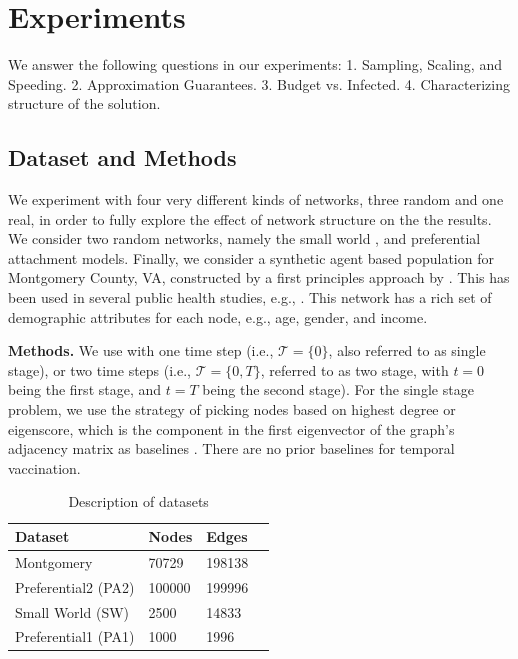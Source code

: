 \section{Experiments}
\label{sec:experiments}
We answer the following questions in our experiments:
1. Sampling, Scaling, and Speeding.
2. Approximation Guarantees.
3. Budget vs. Infected.
4. Characterizing structure of the solution.

\subsection{Dataset and Methods}
We experiment with four very different kinds of networks, three random and one real, in order to fully explore the effect of network structure on the the results. We consider two random networks, namely the small world 
\cite{Kleinberg00thesmall-world}, and preferential attachment \cite{Barabasi509} models. Finally, we consider a synthetic agent based population for Montgomery County, VA, constructed by a first principles approach by \cite{barrett:wsc09,eubank:nature04}. This has been used in several public health studies, e.g., \cite{singh:bmc19}. This network has a rich set of demographic attributes for each node, e.g., age, gender, and income.

\noindent
\textbf{Methods.}
We use \algo{} with one time step (i.e., $\mathcal{T}=\{0\}$, also referred to as single stage), or two time steps (i.e., $\mathcal{T}=\{0, T\}$, referred to as two stage, with $t=0$ being the first stage, and $t=T$ being the second stage). For the single stage problem, we use the strategy of picking nodes based on highest degree or eigenscore, which is the component in the first eigenvector of the graph's adjacency matrix as baselines \cite{tong:cikm12}.
There are no prior baselines for temporal vaccination. 

\begin{table}[!h]
\centering
\begin{tabular}{llll}
\hline
 \textbf{Dataset} & \textbf{Nodes} & \textbf{Edges}   \\ \hline
 Montgomery & 70729 & 198138 \\
Preferential2 (PA2) & 100000 & 199996 \\
 Small World (SW) & 2500 & 14833 \\   
 Preferential1 (PA1) & 1000 & 1996 \\ \hline
\end{tabular}
\caption{Description of datasets}
\label{tab:datasets}
\end{table}

